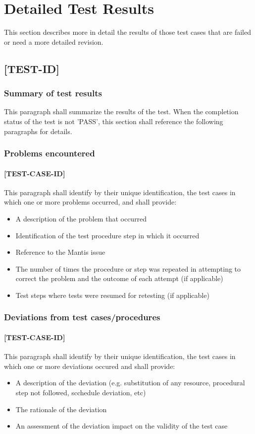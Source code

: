\documentclass[DM,lsstdraft,STR,toc]{lsstdoc}
\begin{document}
\newpage

\section{Detailed Test Results \label{sect:detailed}}
This section describes more in detail the results of those test cases that are failed or need a more detailed revision.
\subsection{[TEST-ID]}
\subsubsection{Summary of test results}
This paragraph shall summarize the results of the test. When the completion status of the test is not 'PASS', this section
shall reference the following paragraphs for details.
\subsubsection{Problems encountered}
\paragraph{[TEST-CASE-ID]}
This paragraph shall identify by their unique identification, the test cases in which one or more problems occurred, and shall provide:
\begin{itemize}
\item A description of the problem that occurred
\item Identification of the test procedure step in which it occurred
\item Reference to the Mantis issue
\item The number of times the procedure or step was repeated in attempting to correct the problem and the outcome of each attempt (if applicable)
\item Test steps where tests were resumed for retesting (if applicable)
\end{itemize}

\subsubsection{Deviations from test cases/procedures}
\paragraph{[TEST-CASE-ID]}
This paragraph shall identify by their unique identification, the test cases in which one or more deviations occured and shall provide:
\begin{itemize}
\item A description of the deviation (e.g. substitution of any resource, procedural step not followed, scchedule deviation, etc)
\item The rationale of the deviation
\item An assessment of the deviation impact on the validity of the test case
\end{itemize}
\end{document}
